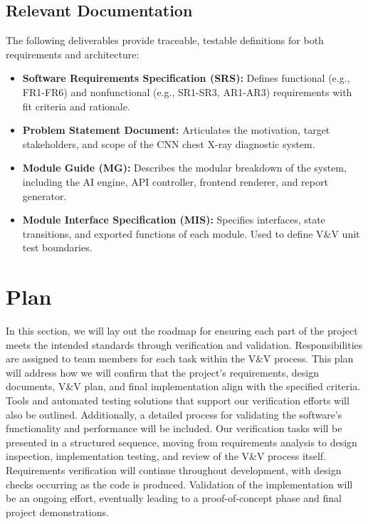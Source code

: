 \documentclass[12pt, titlepage]{article}
\begin{document}
\subsection{Relevant Documentation}
The following deliverables provide traceable, testable definitions for both requirements and architecture:

\begin{itemize}
  \item \textbf{Software Requirements Specification (SRS):} Defines functional (e.g., FR1-FR6) and nonfunctional (e.g., SR1-SR3, AR1-AR3) requirements with fit criteria and rationale.
  \item \textbf{Problem Statement Document:} Articulates the motivation, target stakeholders, and scope of the CNN chest X-ray diagnostic system.
  \item \textbf{Module Guide (MG):} Describes the modular breakdown of the system, including the AI engine, API controller, frontend renderer, and report generator.
  \item \textbf{Module Interface Specification (MIS):} Specifies interfaces, state transitions, and exported functions of each module. Used to define V\&V unit test boundaries.
\end{itemize}


\section{Plan}


In this section, we will lay out the roadmap for ensuring each part of the project meets the intended standards through verification and validation. Responsibilities are assigned to team members for each task within the V\&V process. This plan will address how we will confirm that the project's requirements, design documents, V\&V plan, and final implementation align with the specified criteria. Tools and automated testing solutions that support our verification efforts will also be outlined. Additionally, a detailed process for validating the software's functionality and performance will be included. Our verification tasks will be presented in a structured sequence, moving from requirements analysis to design inspection, implementation testing, and review of the V\&V process itself. Requirements verification will continue throughout development, with design checks occurring as the code is produced. Validation of the implementation will be an ongoing effort, eventually leading to a proof-of-concept phase and final project demonstrations.
\end{document}
